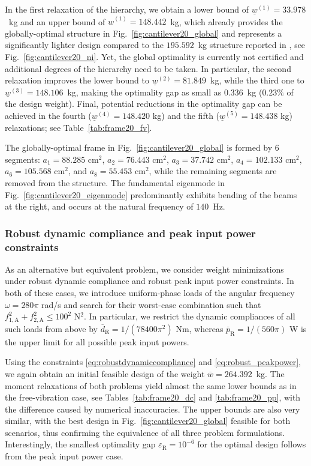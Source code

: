 \documentclass[preprint,3p]{elsarticle}
\newcommand{\A}{\mathrm{A}}
\newcommand{\R}{\mathrm{R}}
\numberwithin{equation}{section}
\begin{document}
In the first relaxation of the hierarchy, we obtain a lower bound of $\underline{w}^{(1)} = 33.978$~kg and an upper bound of $\hat{w}^{(1)} = 148.442$~kg, which already provides the globally-optimal structure in Fig.~\ref{fig:cantilever20_global} and represents a significantly lighter design compared to the $195.592$~kg structure reported in \citep{Ni2014}, see Fig.~\ref{fig:cantilever20_ni}. Yet, the global optimality is currently not certified and additional degrees of the hierarchy need to be taken. In particular, the second relaxation improves the lower bound to $\underline{w}^{(2)} = 81.849$~kg, while the third one to $\underline{w}^{(3)} = 148.106$~kg, making the optimality gap as small as $0.336$~kg ($0.23\%$ of the design weight). Final, potential reductions in the optimality gap can be achieved in the fourth ($\underline{w}^{(4)}=148.420$ kg) and the fifth ($\underline{w}^{(5)} = 148.438$ kg) relaxations; see Table~\ref{tab:frame20_fv}.

The globally-optimal frame in Fig.~\ref{fig:cantilever20_global} is formed by $6$ segments: $a_1 = 88.285$ cm$^2$, $a_2 = 76.443$ cm$^2$, $a_3 = 37.742$ cm$^2$, $a_4 = 102.133$ cm$^2$, $a_6 = 105.568$ cm$^2$, and $a_8 = 55.453$ cm$^2$, while the remaining segments are removed from the structure. The fundamental eigenmode in Fig.~\ref{fig:cantilever20_eigenmode} predominantly exhibits bending of the beams at the right, and occurs at the natural frequency of $140$~Hz.

\subsubsection{Robust dynamic compliance and peak input power constraints}

As an alternative but equivalent problem, we consider weight minimizations under robust dynamic compliance and robust peak input power constraints. In both of these cases, we introduce uniform-phase loads of the angular frequency $\omega = 280 \pi$ rad/s and search for their worst-case combination such that $f_{1,\A}^2 + f_{2,\A}^2 \le 100^2$ N$^2$. In particular, we restrict the dynamic compliances of all such loads from above by $\overline{d}_\R = 1/(78400 \pi^2)$ Nm, whereas $\overline{p}_\R = 1/(560 \pi)$ W is the upper limit for all possible peak input powers.

Using the constraints \eqref{eq:robustdynamiccompliance} and \eqref{eq:robust_peakpower}, we again obtain an initial feasible design of the weight $\overline{w} = 264.392$~kg. The moment relaxations of both problems yield almost the same lower bounds as in the free-vibration case, see Tables~\ref{tab:frame20_dc} and \ref{tab:frame20_pp}, with the difference caused by numerical inaccuracies. The upper bounds are also very similar, with the best design in Fig.~\ref{fig:cantilever20_global} feasible for both scenarios, thus confirming the equivalence of all three problem formulations. Interestingly, the smallest optimality gap $\varepsilon_\R = 10^{-6}$ for the optimal design follows from the peak input power case.
\end{document}
